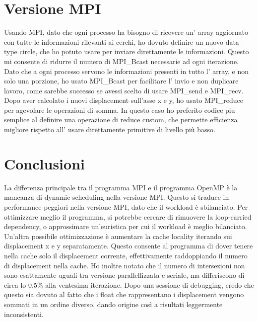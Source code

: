 \documentclass[a4paper,12pt]{report}
\begin{document}
\section{Versione MPI}
Usando MPI, dato che ogni processo ha bisogno di ricevere un' array aggiornato con tutte le informazioni rilevanti ai cerchi, 
ho dovuto definire un nuovo data type circle, che ho potuto usare per inviare direttamente le informazioni. 
Questo mi consente di ridurre il numero di MPI\_Bcast necessarie ad ogni iterazione. Dato che a ogni processo servono le
informazioni presenti in tutto l' array, e non solo una porzione, ho usato MPI\_Bcast per facilitare l' invio e non duplicare lavoro, 
come sarebbe successo se avessi scelto di usare MPI\_send e MPI\_recv. 
Dopo aver calcolato i nuovi displacement sull'asse x e y, ho usato MPI\_reduce per agevolare le operazioni di somma. 
In questo caso ho preferito codice piu semplice al definire una operazione di reduce custom, 
che permette efficienza migliore rispetto all' usare direttamente primitive di livello più basso.

\section{Conclusioni}
La differenza principale tra il programma MPI e il programma OpenMP è la mancanza di dynamic scheduling nella versione MPI. 
Questo si traduce in performance peggiori nella versione MPI, dato che il workload è sbilanciato.
Per ottimizzare meglio il programma, si potrebbe cercare di rimuovere la loop-carried dependency, o approssimare un'euristica per cui il workload è meglio bilanciato. 
Un'altra possibile ottimizzazione è aumentare la cache locality iterando sui displacement x e y separatamente.
Questo consente al programma di dover tenere nella cache solo il displacement corrente, effettivamente raddoppiando il numero di displacement nella cache.
Ho inoltre notato che il numero di intersezioni non sono esattamente uguali tra versione parallellizzata e seriale, ma differiscono di circa lo 0.5\% alla ventesima iterazione. Dopo una sessione di debugging,
credo che questo sia dovuto al fatto che i float che rappresentano i displacement vengono sommati in un ordine diverso, dando origine così a risultati leggermente inconsistenti.
\end{document}
